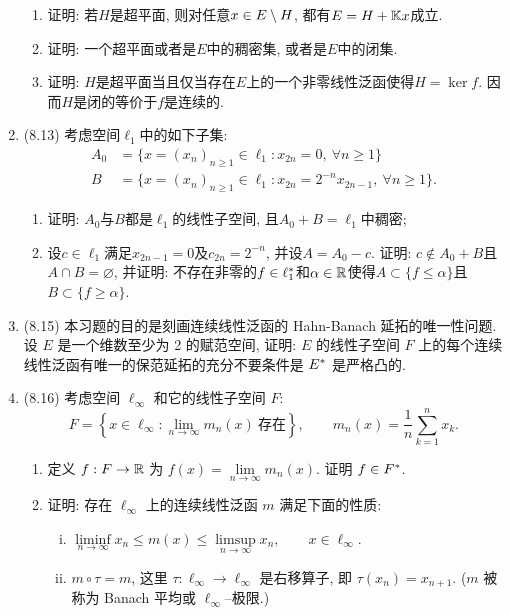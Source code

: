 \begin{enumerate}[label=\textbf{\arabic*.}, ref=\arabic*]
\begin{enumerate}[(1)]
			\item 证明: 若$ H $是超平面, 则对任意$ x\in E\setminus H $, 都有$ E=H+\mathbb{K} x $成立.
			\item 证明: 一个超平面或者是$ E $中的稠密集, 或者是$ E $中的闭集.
			\item 证明: $ H $是超平面当且仅当存在$ E $上的一个非零线性泛函使得$ H=\ker f $. 因而$ H $是闭的等价于$ f $是连续的.
			\end{enumerate}
		\item (8.13) 考虑空间$ \ell_1 $中的如下子集:
			\[
			\begin{aligned}
			A_0&=\{ x=(x_n)_{n\geqslant 1}\in\ell_1 : x_{2n}=0,\ \forall n\geqslant 1 \}\\
			B&=\{ x=(x_n)_{n\geqslant 1}\in\ell_1 : x_{2n}=2^{-n}x_{2n-1},\ \forall n\geqslant 1 \}.
			\end{aligned}
			\]
			\begin{enumerate}[(1)]
			\item 证明: $ A_0 $与$ B $都是$ \ell_1 $的线性子空间, 且$ A_0+B=\ell_1 $中稠密;
			\item 设$ c\in\ell_1 $满足$ x_{2n-1}=0 $及$ c_{2n}=2^{-n} $, 并设$ A=A_0-c $. 证明: $ c\notin A_0+B $且$ A\cap B=\varnothing $, 并证明: 不存在非零的$ f\in\ell_1^{*} $和$ \alpha\in\mathbb{R} $使得$ A\subset\{ f\leqslant\alpha \} $且$ B\subset\{ f\geqslant\alpha \} $.
			\end{enumerate}
		\item (8.15) 本习题的目的是刻画连续线性泛函的 Hahn-Banach 延拓的唯一性问题. 设 $ E $ 是一个维数至少为 2 的赋范空间, 证明: $ E $ 的线性子空间 $ F $ 上的每个连续线性泛函有唯一的保范延拓的充分不要条件是 $ E^{*} $ 是严格凸的.
		\item (8.16) 考虑空间 $ \ell_{\infty} $ 和它的线性子空间 $ F $:
			\[
				F = \left\{ x\in\ell_{\infty}:\lim_{n\to\infty} m_{n}(x)\ \text{存在} \right\}, \qquad m_{n}(x)=\frac{1}{n}\sum_{k=1}^{n} x_{k}.
			\]
			\begin{enumerate}[(1)]
				\item 定义 $ f:F\to\mathbb{R} $ 为 $ f(x)=\lim\limits_{n\to\infty}m_{n}(x) $. 证明 $ f\in F^{*} $.
				\item 证明: 存在 $ \ell_{\infty} $ 上的连续线性泛函 $ m $ 满足下面的性质:
				\begin{enumerate}[(i)]
					\item $ \liminf\limits_{n\to\infty}x_{n}\leqslant m(x)\leqslant\limsup\limits_{n\to\infty}x_{n}, \qquad x\in\ell_{\infty} $.
					\item $ m\circ \tau=m $, 这里 $ \tau: \ell_{\infty}\to\ell_{\infty} $ 是右移算子, 即 $ \tau(x_{n})=x_{n+1} $. ($ m $ 被称为 Banach 平均或 $ \ell_{\infty} $--极限.)

\end{enumerate}
\end{enumerate}
\end{enumerate}
